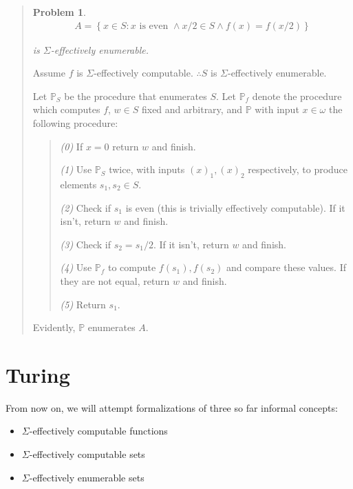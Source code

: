 \documentclass[a4paper, 12pt]{article}
\newtheorem{problem}{Problem}
\newtheorem{problem}{Problem}
\begin{document}
\begin{quote}
\begin{problem}
    \begin{align*}
        A = \left\{ x \in  S : x \text{ is even } \land x / 2 \in S \land f(x) = f(x
        / 2) \right\} 
    \end{align*}

    is $\Sigma$-effectively enumerable.
\end{problem}

Assume $f$ is $\Sigma$-effectively computable.  $\therefore S$ is
$\Sigma$-effectively enumerable. 

Let $\mathbb{P}_S$ be the procedure that enumerates $S$. Let $\mathbb{P}_f$
denote the procedure which computes $f$, $w \in S$ fixed and arbitrary, and $\mathbb{P}$ with input $x \in
\omega$ the following
procedure: 

\begin{quote}

    \textit{(0)} If $x = 0$ return $w$ and finish. 

    \textit{(1)} Use $\mathbb{P}_S$ twice, with inputs $(x)_1, (x)_2$
    respectively, to produce elements $s_1, s_2 \in S$. 

    \textit{(2)} Check if $s_1$ is even (this is trivially effectively
    computable). If it isn't, return $w$ and finish. 

    \textit{(3)} Check if $s_2 = s_1 / 2 $. If it isn't, return $w$ and finish.

    \textit{(4)} Use $\mathbb{P}_f$ to compute $f(s_1), f(s_2)$ and compare
    these values. If they are not equal, return $w$ and finish. 

    \textit{(5)} Return $s_1$.
\end{quote}

Evidently, $\mathbb{P}$ enumerates $A$.


\end{quote}
\normalsize



\pagebreak
\section{Turing}

From now on, we will attempt formalizations of three so far informal concepts: 

\begin{itemize}
    \item $\Sigma$-effectively computable functions
    \item $\Sigma$-effectively computable sets
    \item $\Sigma$-effectively enumerable sets
\end{itemize}
\end{document}
